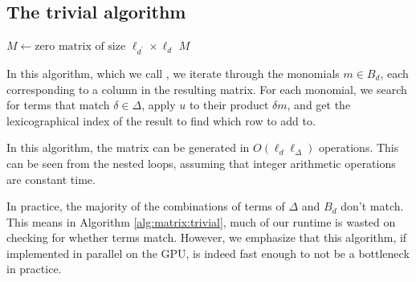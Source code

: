 \subsection{The trivial algorithm}

\begin{algorithm}[H]
    \caption{Matrix of multiply then split: \triv}
    \label{alg:matrix:trivial}
    $M \gets \text{zero matrix of size } \ell_{d^\prime} \times \ell_d $\;
    \Return $M$
\end{algorithm}

In this algorithm, which we call \triv, we iterate through 
the monomials $m \in B_{d}$, each corresponding to a column in the
resulting matrix. For each monomial, we search for terms 
that match $\delta \in \Delta$, apply $u$ to their product $\delta m$, and 
get the lexicographical index of the result to find which 
row to add to.

In this algorithm, the matrix can be generated in 
$O(\ell_{d}\ell_{\Delta})$ operations. 
This can be
seen from the nested loops, assuming that integer 
arithmetic operations are constant time.

In practice, the majority of the combinations of 
terms of $\Delta$ and $B_{d}$ don't match. This means in
Algorithm \ref{alg:matrix:trivial}, much of our 
runtime is wasted on checking for whether terms match.
However, we emphasize that this algorithm, if 
implemented in parallel on the GPU, is indeed
fast enough to not be a bottleneck in practice.


